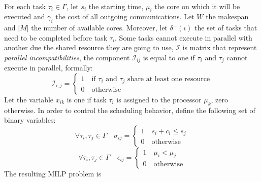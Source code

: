 \paragraph{} For each task $\tau_i\in\Gamma$, let $s_i$ the starting time, $\mu_i$ the core on which it will be executed and $\gamma_i$ the cost of all outgoing communications. Let $W$ the makespan and $|M|$ the number of available cores. Moreover, let $\delta^-(i)$ the set of tasks that need to be completed before task $\tau_i$. Some tasks cannot execute in parallel with another due the shared resource they are going to use, $\mathcal{I}$ is matrix that represent \emph{parallel incompatibilities}, the component $\mathcal{I}_{ij}$ is equal to one if $\tau_i$ and $\tau_j$ cannot execute in parallel, formally:
\[
\mathcal{I}_{i,j}=
\begin{cases}
1\quad \text{if } \tau_i \text{ and } \tau_j \text{ share at least one resource}\\
0\quad\text{otherwise}
\end{cases}
\]
Let the variable $x_{ik}$ is one if task $\tau_i$ is assigned to the processor $\mu_k$, zero otherwise. In order to control the scheduling behavior, define the following set of binary variables:
\[
\forall \tau_i,\tau_j\in\Gamma \quad \sigma_{ij}=
\begin{cases}
1\quad s_i+c_i\leq s_j \\
0\quad\text{otherwise}
\end{cases}
\]
\[
\forall \tau_i,\tau_j\in\Gamma \quad \epsilon_{ij}=
\begin{cases}
1\quad\mu_i<\mu_j \\
0\quad\text{otherwise}
\end{cases}
\]
The resulting MILP problem is
